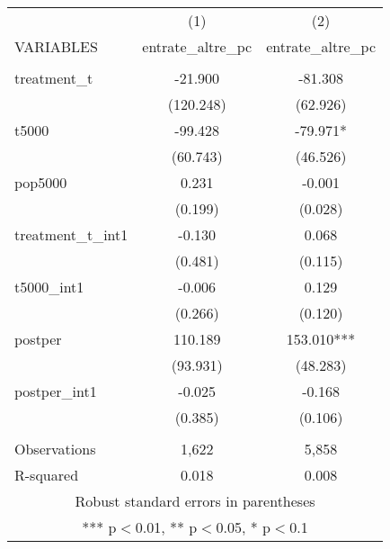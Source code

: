 \documentclass[]{article}
\begin{document}
\begin{tabular}{lcc} \hline
 & (1) & (2) \\
VARIABLES & entrate\_altre\_pc & entrate\_altre\_pc \\ \hline
 &  &  \\
treatment\_t & -21.900 & -81.308 \\
 & (120.248) & (62.926) \\
t5000 & -99.428 & -79.971* \\
 & (60.743) & (46.526) \\
pop5000 & 0.231 & -0.001 \\
 & (0.199) & (0.028) \\
treatment\_t\_int1 & -0.130 & 0.068 \\
 & (0.481) & (0.115) \\
t5000\_int1 & -0.006 & 0.129 \\
 & (0.266) & (0.120) \\
postper & 110.189 & 153.010*** \\
 & (93.931) & (48.283) \\
postper\_int1 & -0.025 & -0.168 \\
 & (0.385) & (0.106) \\
 &  &  \\
Observations & 1,622 & 5,858 \\
 R-squared & 0.018 & 0.008 \\ \hline
\multicolumn{3}{c}{ Robust standard errors in parentheses} \\
\multicolumn{3}{c}{ *** p$<$0.01, ** p$<$0.05, * p$<$0.1} \\
\end{tabular}
\end{document}
